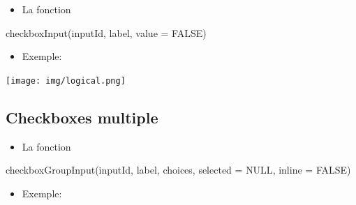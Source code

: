 \documentclass[
]{article}
\newenvironment{Shaded}{\begin{snugshade}}{\end{snugshade}}
\newcommand{\AttributeTok}[1]{\textcolor[rgb]{0.77,0.63,0.00}{#1}}
\newcommand{\CommentTok}[1]{\textcolor[rgb]{0.56,0.35,0.01}{\textit{#1}}}
\newcommand{\ConstantTok}[1]{\textcolor[rgb]{0.00,0.00,0.00}{#1}}
\newcommand{\FunctionTok}[1]{\textcolor[rgb]{0.00,0.00,0.00}{#1}}
\newcommand{\NormalTok}[1]{#1}
\newcommand{\StringTok}[1]{\textcolor[rgb]{0.31,0.60,0.02}{#1}}
\providecommand{\tightlist}{%
  \setlength{\itemsep}{0pt}\setlength{\parskip}{0pt}}
\begin{document}
\begin{itemize}
\tightlist
\item
  La fonction
\end{itemize}

\begin{Shaded}
\begin{Highlighting}[]
\FunctionTok{checkboxInput}\NormalTok{(inputId, label, }\AttributeTok{value =} \ConstantTok{FALSE}\NormalTok{)}
\end{Highlighting}
\end{Shaded}

\begin{itemize}
\tightlist
\item
  Exemple:
\end{itemize}

\begin{Shaded}
\end{Shaded}

\texttt{[image: img/logical.png]}

\hypertarget{checkboxes-multiple}{%
\subsection{Checkboxes multiple}\label{checkboxes-multiple}}

\begin{itemize}
\tightlist
\item
  La fonction
\end{itemize}

\begin{Shaded}
\begin{Highlighting}[]
\FunctionTok{checkboxGroupInput}\NormalTok{(inputId, label, choices, }\AttributeTok{selected =} \ConstantTok{NULL}\NormalTok{, }\AttributeTok{inline =} \ConstantTok{FALSE}\NormalTok{)}
\end{Highlighting}
\end{Shaded}

\begin{itemize}
\tightlist
\item
  Exemple:
\end{itemize}
\end{document}
